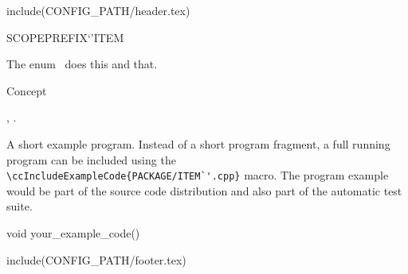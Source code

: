 include(CONFIG_PATH/header.tex)
\begin{ccRefEnum}SCOPE{PREFIX`'ITEM}  %


\ccDefinition
  
The enum \ccRefName\ does this and that.



\ccIsModel

Concept

\ccSeeAlso

,
.

\ccExample

A short example program.
Instead of a short program fragment, a full running program can be
included using the 
\verb|\ccIncludeExampleCode{PACKAGE/ITEM`'.cpp}| 
macro. The program example would be part of the source code distribution and
also part of the automatic test suite.

\begin{ccExampleCode}
void your_example_code() {
}
\end{ccExampleCode}


\end{ccRefEnum}

include(CONFIG_PATH/footer.tex)
